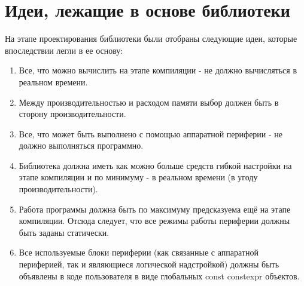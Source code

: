 \chapter{Идеи, лежащие в основе библиотеки}На этапе проектирования библиотеки были отобраны следующие идеи, которые впоследствии легли в ее основу:
\begin{enumerate}
	\item Все, что можно вычислить на этапе компиляции - не должно вычисляться в реальном времени. 
	\item Между производительностью и расходом памяти выбор должен быть в сторону производительности.
	\item Все, что может быть выполнено с помощью аппаратной периферии - не должно выполняться программно.
	\item Библиотека должна иметь как можно больше средств гибкой настройки на этапе компиляции и по минимуму - в реальном времени (в угоду производительности).
	\item Работа программы должна быть по максимуму предсказуема ещё на этапе компиляции. Отсюда следует, что все режимы работы периферии должны быть заданы статически.
	\item Все используемые блоки периферии (как связанные с аппаратной периферией, так и являющиеся логической надстройкой) должны быть объявлены в коде пользователя в виде глобальных const constexpr объектов.
\end{enumerate}